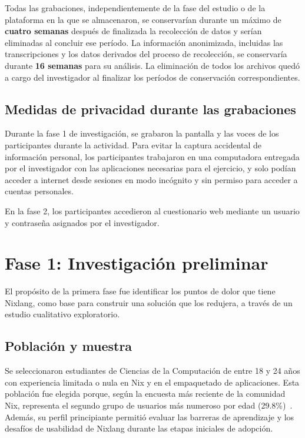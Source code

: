 Todas las grabaciones, independientemente de la fase del estudio o de la plataforma en la que se almacenaron, se conservarían durante un máximo de \textbf{cuatro semanas} después de finalizada la recolección de datos y serían eliminadas al concluir ese período. La información anonimizada, incluidas las transcripciones y los datos derivados del proceso de recolección, se conservaría durante \textbf{16 semanas} para su análisis. La eliminación de todos los archivos quedó a cargo del investigador al finalizar los períodos de conservación correspondientes.

\subsection{Medidas de privacidad durante las grabaciones}

Durante la fase 1 de investigación, se grabaron la pantalla y las voces de los participantes durante la actividad. Para evitar la captura accidental de información personal, los participantes trabajaron en una computadora entregada por el investigador con las aplicaciones necesarias para el ejercicio, y solo podían acceder a internet desde sesiones en modo incógnito y sin permiso para acceder a cuentas personales.

En la fase 2, los participantes accedieron al cuestionario web mediante un usuario y contraseña asignados por el investigador.

\section{Fase 1: Investigación preliminar}\label{phase1}

El propósito de la primera fase fue identificar los puntos de dolor que tiene Nixlang, como base para construir una solución que los redujera, a través de un estudio cualitativo exploratorio.

\subsection{Población y muestra}

Se seleccionaron estudiantes de Ciencias de la Computación de entre 18 y 24 años con experiencia limitada o nula en Nix y en el empaquetado de aplicaciones. Esta población fue elegida porque, según la encuesta más reciente de la comunidad Nix, representa el segundo grupo de usuarios más numeroso por edad (29.8\%)~\cite{NixCommunitySurvey2024}. Además, su perfil principiante permitió evaluar las barreras de aprendizaje y los desafíos de usabilidad de Nixlang durante las etapas iniciales de adopción.

